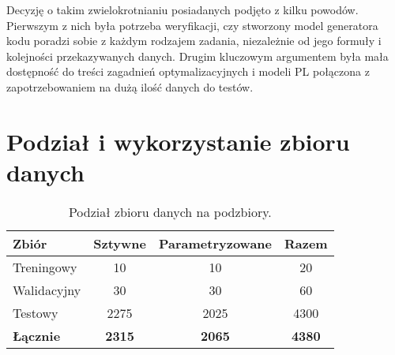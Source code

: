 
Decyzję o takim zwielokrotnianiu posiadanych podjęto z kilku powodów. Pierwszym z nich była potrzeba weryfikacji, czy stworzony model generatora kodu  poradzi sobie z każdym rodzajem zadania, niezależnie od jego formuły i kolejności przekazywanych danych. Drugim kluczowym argumentem była mała dostępność do treści zagadnień optymalizacyjnych i modeli PL połączona z zapotrzebowaniem na dużą ilość danych do testów.

\section{Podział i wykorzystanie zbioru danych}

\begin{table}[H]
\caption{Podział zbioru danych na podzbiory.}\label{tab:dataset:stats}
\centering%
\begin{tabular}{|l|c|c|c|}
\hline
\textbf{Zbiór} & \textbf{Sztywne} & \textbf{Parametryzowane} & \textbf{Razem} \\
\hline
Treningowy & 10 & 10 & 20\\
\hline
Walidacyjny & 30 & 30 & 60\\
\hline
Testowy & 2275 & 2025 & 4300\\
\hline
\textbf{Łącznie} & \textbf{2315} & \textbf{2065} & \textbf{4380}\\
\hline
\end{tabular}
\end{table}


